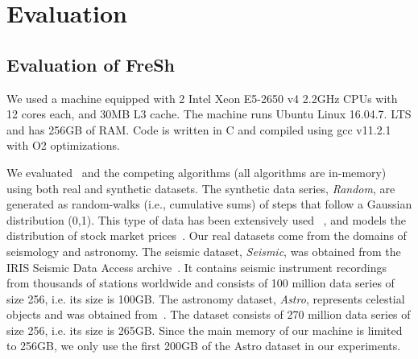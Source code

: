
\chapter{Evaluation}
\label{chapter:Evaluation}

\section{Evaluation of FreSh}

% 
We used a machine equipped with 2 Intel  Xeon E5-2650 v4 2.2GHz
CPUs with 12 cores each, and 30MB L3 cache. The machine runs
Ubuntu Linux 16.04.7. LTS and has 256GB of RAM. Code is written in C and
compiled using gcc v11.2.1 with O2 optimizations.

We evaluated \Fresh\ and the competing algorithms (all algorithms are in-memory) using both real and synthetic datasets.
The synthetic data series, \emph{Random}, are generated as random-walks (i.e., cumulative sums) of 
steps that follow a Gaussian distribution (0,1).
This type of data has been extensively used
~\cite{conf/sigmod/Faloutsos1994,isax2plus,conf/kdd/Zoumpatianos2015,DBLP:journals/vldb/ZoumpatianosLIP18,DBLP:journals/pvldb/EchihabiZPB18,DBLP:journals/pvldb/EchihabiZPB19}, 
and models the distribution of stock market prices~\cite{conf/sigmod/Faloutsos1994}.
Our real datasets come from the domains of seismology and astronomy.
The seismic dataset, \emph{Seismic}, was obtained from the IRIS Seismic Data Access
archive~\cite{url/data/seismic}. It contains seismic instrument recordings from
thousands of stations worldwide and consists of 100 million data series of size 256,
i.e. its size is 100GB. 
The astronomy dataset, \emph{Astro}, represents celestial objects and was obtained 
from~\cite{journal/aa/soldi2014}. The dataset consists of 270 million data series of
size 256, i.e. its size is 265GB.
% 
Since the main memory of our machine is limited to 256GB, we only use the first 200GB
of the Astro dataset in our experiments.


